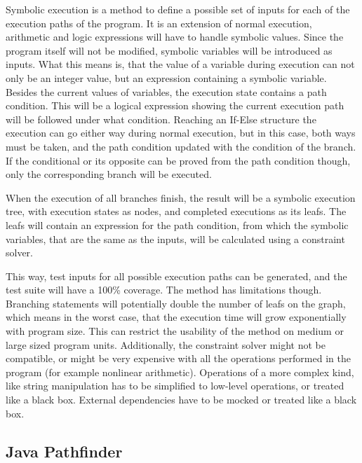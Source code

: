 Symbolic execution is a method to define a possible set of inputs for each of the execution paths of the program. It is an extension of normal execution, arithmetic and logic expressions will have to handle symbolic values. Since the program itself will not be modified, symbolic variables will be introduced as inputs. What this means is, that the value of a variable during execution can not only be an integer value, but an expression containing a symbolic variable.
Besides the current values of variables, the execution state contains a path condition. This will be a logical expression showing the current execution path will be followed under what condition. Reaching an If-Else structure the execution can go either way during normal execution, but in this case, both ways must be taken, and the path condition updated with the condition of the branch. If the conditional or its opposite can be proved from the path condition though, only the corresponding branch will be executed. \cite{King:1976:SEP:360248.360252}

When the execution of all branches finish, the result will be a symbolic execution tree, with execution states as nodes, and completed executions as its leafs. The leafs will contain an expression for the path condition, from which the symbolic variables, that are the same as the inputs, will be calculated using a constraint solver.

This way, test inputs for all possible execution paths can be generated, and the test suite will have a 100\% coverage. The method has limitations though. Branching statements will potentially double the number of leafs on the graph, which means in the worst case, that the execution time will grow exponentially with program size. This can restrict the usability of the method on medium or large sized program units. Additionally, the constraint solver might not be compatible, or might be very expensive with all the operations performed in the program (for example nonlinear arithmetic). \cite{z3_tutorial} Operations of a more complex kind, like string manipulation has to be simplified to low-level operations, or treated like a black box. External dependencies have to be mocked or treated like a black box.

\subsection{Java Pathfinder}
